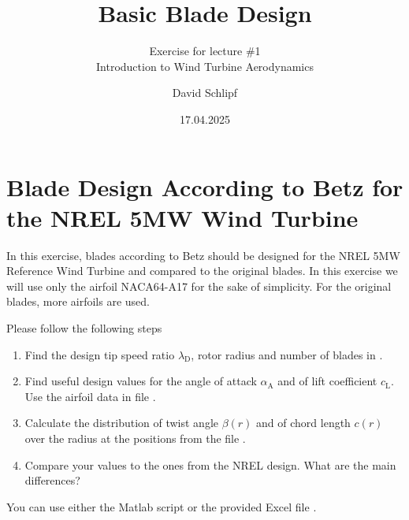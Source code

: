 \documentclass[a4paper,11pt,DIV=20,BCOR=10mm] {scrartcl}
\title{Basic Blade Design}
\subtitle{\ifsolution{\textcolor{red}{Solution of }}\fi Exercise for lecture \#1 \\ Introduction to Wind Turbine Aerodynamics}
\author{David Schlipf}
\date{17.04.2025}
\newif\ifsolution
\begin{document}
\maketitle 
\section*{Blade Design According to Betz for the NREL 5MW Wind Turbine}
In this exercise, blades according to Betz should be designed for the NREL 5MW Reference Wind Turbine \cite{Jonkman2009a} and compared to the original blades.
In this exercise we will use only the airfoil NACA64-A17 for the sake of simplicity. For the original blades, more airfoils are used.

Please follow the following steps
\begin{enumerate}[noitemsep,label=\alph*)] 
	\item Find the design tip speed ratio $\lambda_{\textrm{D}}$, rotor radius and number of blades in \cite{Jonkman2009a}.
	\ifsolution{\textcolor{red}{$R=\SI{63}{m}$, $\lambda_{\textnormal{D}}=7.55$, $z=3$.}}\fi
	\item Find useful design values for the angle of attack $\alpha_{\textrm{A}}$ and of lift coefficient $c_{\textrm{L}}$. Use the airfoil data in file .
	\ifsolution{\textcolor{red}{$\alpha_{\textnormal{A}}=\SI{5}{\degree}$, $c_{\textnormal{L}}=1.011$.}}\fi
	\item Calculate the distribution of twist angle $\beta(r)$ and of chord length $c(r)$ over the radius at the positions from the file .
	\ifsolution{
		\newline
		\texttt{[image: Figures/ComparisonTwistAngle]} \texttt{[image: Figures/ComparisonChordLength]} 
		\newline
		}\fi
	\item Compare your values to the ones from the NREL design. What are the main differences?
	\ifsolution{\textcolor{red}{Larger values for twist angle and chord length in root region.}}\fi
\end{enumerate}

You can use either the Matlab script  or the provided Excel file .


\printbibliography
\end{document}
